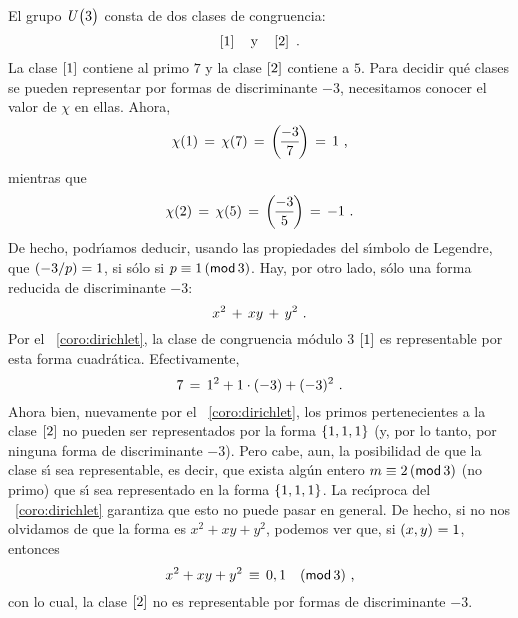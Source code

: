 \begin{ejemDirichlet}\label{ejem:dirichlet:representacion:tres}
	El grupo $\Unidadesmod[3]$ consta de dos clases de congruencia:
	\begin{displaymath}
		\clase 1\dispand\clase 2
		\dispstop
	\end{displaymath}
	La clase $\clase 1$ contiene al primo $7$ y la clase
	$\clase 2$ contiene a $5$. Para decidir qu\'e clases
	se pueden representar por formas de discriminante $-3$,
	necesitamos conocer el valor de $\chi$ en ellas.
	Ahora,
	\begin{displaymath}
		\chi(1)\,=\,\chi(7)\,=\,\legendre{-3} 7\,=\,1
		\dispcomma
	\end{displaymath}
	mientras que
	\begin{displaymath}
		\chi(2)\,=\,\chi(5)\,=\,\legendre{-3} 5\,=\,-1
		\dispstop
	\end{displaymath}
	De hecho, podr\'{\i}amos deducir, usando las propiedades del
	s\'{\i}mbolo de Legendre, que $\tlegendre{-3} p=1$, si s\'olo si
	$p\equiv 1\tmodulo[3]$.
	Hay, por otro lado, s\'olo una forma reducida de discriminante
	$-3$:
	\begin{displaymath}
		x^2\,+\,xy\,+\,y^2
		\dispstop
	\end{displaymath}
	Por el \coroname~\ref{coro:dirichlet}, la clase de congruencia
	m\'odulo $3$ $\clase 1$ es representable por esta forma
	cuadr\'atica. Efectivamente,
	\begin{displaymath}
		7\,=\,1^2+1\cdot (-3)+(-3)^2
		\dispstop
	\end{displaymath}
	Ahora bien, nuevamente por el \coroname~\ref{coro:dirichlet},
	los primos pertenecientes a la clase $\clase 2$ no pueden
	ser representados por la forma $\binaria{1,1,1}$
	(y, por lo tanto, por ninguna forma de discriminante $-3$).
	Pero cabe, aun, la posibilidad de que la clase s\'{\i} sea
	representable, es decir, que exista alg\'un entero
	$m\equiv 2\tmodulo[3]$ (no primo) que s\'{\i} sea representado
	en la forma $\binaria{1,1,1}$. La rec\'{\i}proca del
	\coroname~\ref{coro:dirichlet} garantiza que esto no puede
	pasar en general. De hecho, si no nos olvidamos de que la
	forma es $x^2+xy+y^2$, podemos ver que, si $\mcd{x,y}=1$, entonces
	\begin{displaymath}
		x^2+xy+y^2\,\equiv\,0,1\modulo[3]
		\dispcomma
	\end{displaymath}
	con lo cual, la clase $\clase 2$ no es representable por
	formas de discriminante $-3$.
\end{ejemDirichlet}


